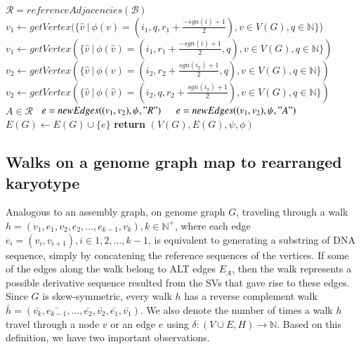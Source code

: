 \documentclass[phd,tocprelim]{cornell}
\begin{document}
\newpage

\begin{algorithm}[h!]
    \begin{algorithmic}
        \State $\mathcal{R} = referenceAdjacencies(\mathcal{B})$  
        \State $v_1 \gets getVertex(\{ \hat{v} \ | \ \phi(v) = (i_1, q, r_1+\frac{-sgn(i)+1}{2}), v \in V(G), q \in \mathbb{N}\}$)
        \Else
        \State $v_1 \gets getVertex(\{ \hat{v} \ | \ \phi(\hat{v}) = (i_1, r_1 + \frac{-sgn(i)+1}{2}, q), v \in V(G), q \in \mathbb{N}\})$
        \EndIf
        \State $v_2 \gets getVertex(\{ \hat{v} \ | \ \phi(v) = (i_2, r_2 + \frac{sgn(i_2)+1}{2}, q), v \in V(G), q \in \mathbb{N}\})$
        \Else
        \State $v_2 \gets getVertex(\{ \hat{v} \ | \ \phi(\hat{v}) = (i_2, q, r_2 + \frac{sgn(i_2)+1}{2}), v \in V(G), q \in \mathbb{N} \})$
        \EndIf
        \State \algorithmicif\ $A \in \mathcal{R}$ \algorithmicthen\ $e = newEdges((v_1, v_2), \psi, "R")$ \ \algorithmicelse \ $e = newEdges((v_1, v_2), \psi, "A")$
        \State $E(G) \gets E(G) \cup \{e\}$
        \EndFor
        \State \textbf{return} $(V(G), E(G), \psi, \phi)$
        \EndProcedure
    \end{algorithmic}
\end{algorithm}

\newpage

\subsection{Walks on a genome graph map to rearranged karyotype}
Analogous to an assembly graph, on genome graph $G$, traveling through a walk $h = (v_1, e_1, v_2, e_2, \dots, e_{k-1}, v_k), k \in \mathbb{N^+}$, where each edge $e_i = (v_i, v_{i+1}), i \in 1, 2, \dots, k-1$, is equivalent to generating a substring of DNA sequence, simply by concatening the reference sequences of the vertices. If some of the edges along the walk belong to ALT edges $E_{A}$, then the walk represents a possible derivative sequence resulted from the SVs that gave rise to these edges. Since $G$ is skew-symmetric, every walk $h$ has a reverse complement walk $\bar{h} = (\bar{v_k}, \bar{e_{k-1}}, \dots, \bar{e_2}, \bar{v_2}, \bar{e_1}, \bar{v_1})$. We also denote the number of times a walk $h$ travel through a node $v$ or an edge $e$ using $\delta : (V \cup E, H) \rightarrow \mathbb{N}$. Based on this definition, we have two important observations.
\end{document}
